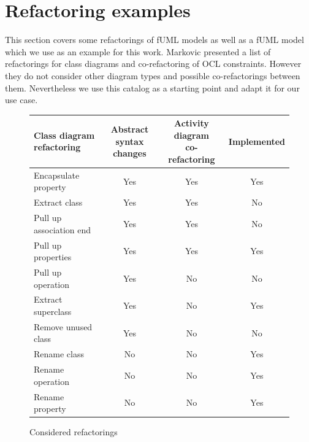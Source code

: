 \documentclass{llncs}
\begin{document}


\section{Refactoring examples}
\label{refactoring-examples}

This section covers some refactorings of fUML models as well as a fUML model which we use as an example for this work. 
Markovic \cite{DBLP:journals/sosym/MarkovicB08} presented a list of refactorings for class 
diagrams and co-refactoring of OCL constraints. However they do not consider other diagram types and possible co-refactorings between 
them. Nevertheless we use this catalog as a starting point and adapt it for our use case. 

\begin{figure}[h!t]
 \centering
 \begin{tabular}[]{l | c | c | c}
  \shortstack{Class diagram\\refactoring} & \shortstack{Abstract syntax\\changes} & \shortstack{Activity diagram\\co-refactoring} & Implemented\\
  \hline
  Encapsulate property & Yes & Yes & Yes\\
  Extract class & Yes & Yes & No\\
  Pull up association end & Yes & Yes & No\\
  Pull up properties & Yes & Yes & Yes\\
  Pull up operation & Yes & No & No\\
  Extract superclass & Yes & No & Yes\\
  Remove unused class & Yes & No & No\\
  Rename class & No & No & Yes\\
  Rename operation & No & No & Yes\\
  Rename property & No & No & Yes\\
 \end{tabular}
 \caption{Considered refactorings}
 \label{fig:refactoringlist}
\end{figure}
\end{document}
